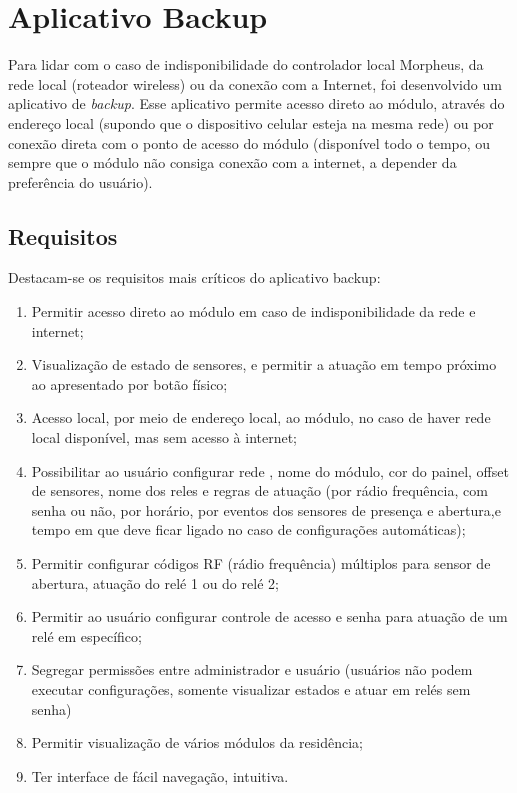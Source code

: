 \section{Aplicativo Backup}

Para lidar com o caso de indisponibilidade do controlador local Morpheus, da rede local (roteador wireless) ou da conexão com a Internet, foi desenvolvido um aplicativo de \textit{backup}. Esse aplicativo permite acesso direto ao módulo, através do endereço local (supondo que o dispositivo celular esteja na mesma rede) ou por conexão direta com o ponto de acesso do módulo (disponível todo o tempo, ou sempre que o módulo não consiga conexão com a internet, a depender da preferência do usuário).

\subsection{Requisitos}

Destacam-se os requisitos mais críticos do aplicativo backup:

\begin{enumerate}
	\item Permitir acesso direto ao módulo em caso de indisponibilidade da rede \wwifi e internet;
	\item Visualização de estado de sensores, e permitir a atuação em tempo próximo ao apresentado por botão físico;
	\item Acesso local, por meio de endereço local, ao módulo, no caso de haver rede local disponível, mas sem acesso à internet;
	\item Possibilitar ao usuário configurar rede \wwifi, nome do módulo, cor do painel, offset de sensores, nome dos reles e regras de atuação (por rádio frequência, com senha ou não, por horário, por eventos dos sensores de presença e abertura,e tempo em que deve ficar ligado no caso de configurações automáticas);
	\item Permitir configurar códigos RF (rádio frequência) múltiplos para sensor de abertura, atuação do relé 1 ou do relé 2;
	\item Permitir ao usuário configurar controle de acesso e senha para atuação de um relé em específico;
	\item Segregar permissões entre administrador e usuário (usuários não podem executar configurações, somente visualizar estados e atuar em relés sem senha)
	\item Permitir visualização de vários módulos da residência;
	\item Ter interface de fácil navegação, intuitiva.
\end{enumerate}

